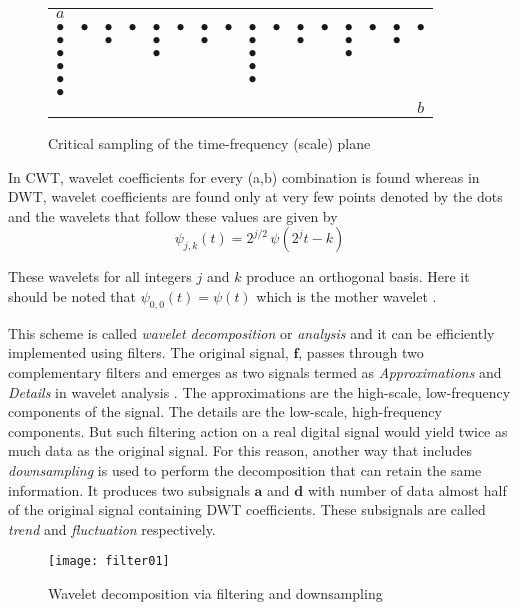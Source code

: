 \documentclass[a4paper,11pt]{report}
\begin{document}
\begin{figure}[h]
\centering
\begin{tabular}{|cccccccccccccccc}
$a$ &  &  &  &  &  &  &  &  &  &  &  &  &  &  &  \\
$\bullet$ & $\bullet$ & $\bullet$ & $\bullet$ & $\bullet$ & $\bullet$ & $\bullet$ & $\bullet$ & $\bullet$ & $\bullet$ & $\bullet$ & $\bullet$ & $\bullet$ & $\bullet$ & $\bullet$ & $\bullet$ \\
$\bullet$ &  & $\bullet$ &  & $\bullet$ &  & $\bullet$ &  & $\bullet$ & & $\bullet$ &  & $\bullet$ & & $\bullet$ &  \\
$\bullet$ &  &  &  & $\bullet$ &  &  &  & $\bullet$ &  &  &  & $\bullet$ &  &  &  \\
$\bullet$ &  &  &  &  &  &  &  & $\bullet$ &  &  &  &  &  &  &  \\
$\bullet$ &  &  &  &  &  &  &  & $\bullet$ &  &  &  &  &  &  &  \\
$\bullet$ &  &  &  &  &  &  &  &  &  &  &  &  &  &  &  \\
\hline
\multicolumn{15}{c}{} &$b$
\end{tabular}
\caption{Critical sampling of the time-frequency (scale) plane}\label{t-f}
\end{figure}

In CWT, wavelet coefficients  for every (a,b) combination is found whereas in DWT, wavelet coefficients are found only at very few points denoted by the dots and the wavelets that follow these values are given by
\begin{displaymath}
\psi_{j,k}(t) = 2^{j/2}\,\psi(2^{j}t - k)
\end{displaymath}

These wavelets for all integers $j$ and $k$ produce an orthogonal basis. Here it should be noted that $\psi_{0,0}(t) = \psi(t)$ which is the mother wavelet \cite{bopardikar}.

This scheme is called \emph{wavelet decomposition} or \emph{analysis} and it can be efficiently implemented using filters. The original signal, $\mathbf{f}$, passes through two complementary filters and emerges as two signals termed as \emph{Approximations}  and \emph{Details} in wavelet analysis \cite{walker}. The approximations are the high-scale, low-frequency components of the signal. The details are the low-scale, high-frequency components. But such filtering action on a real digital signal would yield twice as much data as the original signal. For this reason, another way that includes \emph{downsampling} is used to perform the decomposition that can retain the same information. It produces two subsignals $\mathbf{a}$ and $\mathbf{d}$ with number of data almost half of the original signal containing DWT coefficients. These subsignals are called \emph{trend} and \emph{fluctuation} respectively.
\begin{figure}[h]
\centering
\texttt{[image: filter01]}
\caption{Wavelet decomposition via filtering and downsampling} \label{filter01}
\end{figure}
\end{document}
